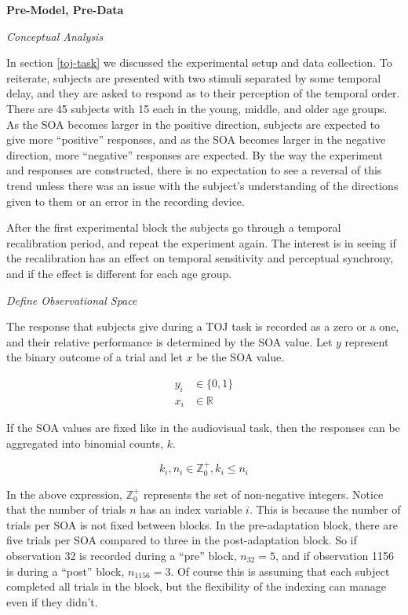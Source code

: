 \documentclass[11pt, oneside, openany]{scrbook}
\begin{document}
\textbf{Pre-Model, Pre-Data}

\emph{Conceptual Analysis}

In section \ref{toj-task} we discussed the experimental setup and data collection. To reiterate, subjects are presented with two stimuli separated by some temporal delay, and they are asked to respond as to their perception of the temporal order. There are 45 subjects with 15 each in the young, middle, and older age groups. As the SOA becomes larger in the positive direction, subjects are expected to give more ``positive'' responses, and as the SOA becomes larger in the negative direction, more ``negative'' responses are expected. By the way the experiment and responses are constructed, there is no expectation to see a reversal of this trend unless there was an issue with the subject's understanding of the directions given to them or an error in the recording device.

After the first experimental block the subjects go through a temporal recalibration period, and repeat the experiment again. The interest is in seeing if the recalibration has an effect on temporal sensitivity and perceptual synchrony, and if the effect is different for each age group.

\emph{Define Observational Space}

The response that subjects give during a TOJ task is recorded as a zero or a one, and their relative performance is determined by the SOA value. Let \(y\) represent the binary outcome of a trial and let \(x\) be the SOA value.

\begin{align*}
y_i &\in \lbrace 0, 1\rbrace \\
x_i &\in \mathbb{R}
\end{align*}

If the SOA values are fixed like in the audiovisual task, then the responses can be aggregated into binomial counts, \(k\).

\[k_i, n_i \in \mathbb{Z}_0^+, k_i \le n_i\]

In the above expression, \(\mathbb{Z}_0^+\) represents the set of non-negative integers. Notice that the number of trials \(n\) has an index variable \(i\). This is because the number of trials per SOA is not fixed between blocks. In the pre-adaptation block, there are five trials per SOA compared to three in the post-adaptation block. So if observation 32 is recorded during a ``pre'' block, \(n_{32} = 5\), and if observation 1156 is during a ``post'' block, \(n_{1156} = 3\). Of course this is assuming that each subject completed all trials in the block, but the flexibility of the indexing can manage even if they didn't.
\end{document}

